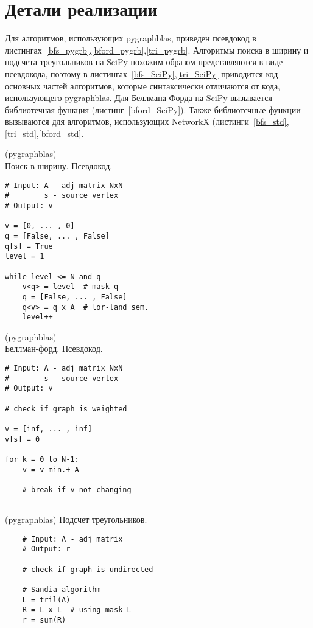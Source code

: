 \section{Детали реализации}

Для алгоритмов, использующих pygraphblas, приведен псевдокод в листингах~\ref{bfs_pygrb},\ref{bford_pygrb},\ref{tri_pygrb}. 
Алгоритмы поиска в ширину и подсчета треугольников на SciPy похожим образом представляются в виде псевдокода, поэтому в 
листингах~\ref{bfs_SciPy},\ref{tri_SciPy} приводится код основных частей алгоритмов, которые синтаксически отличаются от кода, 
использующего pygraphblas. Для Беллмана-Форда на SciPy вызывается библиотечная функция (листинг~\ref{bford_SciPy}). Также 
библиотечные функции вызываются для алгоритмов, использующих NetworkX (листинги~\ref{bfs_std},\ref{tri_std},\ref{bford_std}.


\begin{minipage}{0.46\textwidth}
\begin{algorithm}[H]
\centering
\caption{(pygraphblas)\\Поиск в ширину. Псевдокод.}\label{bfs_pygrb}
\begin{verbatim}
# Input: A - adj matrix NxN
#        s - source vertex
# Output: v

v = [0, ... , 0]
q = [False, ... , False]
q[s] = True
level = 1

while level <= N and q
    v<q> = level  # mask q
    q = [False, ... , False]
    q<v> = q x A  # lor-land sem.
    level++
\end{verbatim}
\end{algorithm}
\end{minipage}\hfill
\begin{minipage}{0.46\textwidth}
\begin{algorithm}[H]
\centering
\caption{(pygraphblas)\\Беллман-форд. Псевдокод.}\label{bford_pygrb}
\begin{verbatim}
# Input: A - adj matrix NxN
#        s - source vertex
# Output: v

# check if graph is weighted

v = [inf, ... , inf]
v[s] = 0

for k = 0 to N-1:
    v = v min.+ A 
    
    # break if v not changing
    
\end{verbatim}
\end{algorithm}
\end{minipage}\par
\begin{minipage}{0.96\textwidth}
\begin{algorithm}[H]
    \centering
    \caption{(pygraphblas) Подсчет треугольников.}\label{tri_pygrb}
    \begin{verbatim}
    # Input: A - adj matrix
    # Output: r
    
    # check if graph is undirected
    
    # Sandia algorithm
    L = tril(A)
    R = L x L  # using mask L
    r = sum(R)
    \end{verbatim}
\end{algorithm}
\end{minipage}\hfill

